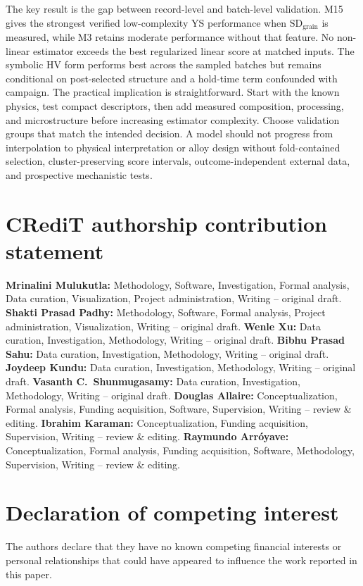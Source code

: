 \documentclass[5p,times,twocolumn]{elsarticle}
\begin{document}
The key result is the gap between record-level and batch-level validation. M15 gives the strongest verified low-complexity YS performance when $\mathrm{SD}_{\mathrm{grain}}$ is measured, while M3 retains moderate performance without that feature. No non-linear estimator exceeds the best regularized linear score at matched inputs. The symbolic HV form performs best across the sampled batches but remains conditional on post-selected structure and a hold-time term confounded with campaign. The practical implication is straightforward. Start with the known physics, test compact descriptors, then add measured composition, processing, and microstructure before increasing estimator complexity. Choose validation groups that match the intended decision. A model should not progress from interpolation to physical interpretation or alloy design without fold-contained selection, cluster-preserving score intervals, outcome-independent external data, and prospective mechanistic tests.

\section*{CRediT authorship contribution statement}
\textbf{Mrinalini Mulukutla:} Methodology, Software, Investigation, Formal analysis, Data curation, Visualization, Project administration, Writing -- original draft.
\textbf{Shakti Prasad Padhy:} Methodology, Software, Formal analysis, Project administration, Visualization, Writing -- original draft.
\textbf{Wenle Xu:} Data curation, Investigation, Methodology, Writing -- original draft.
\textbf{Bibhu Prasad Sahu:} Data curation, Investigation, Methodology, Writing -- original draft.
\textbf{Joydeep Kundu:} Data curation, Investigation, Methodology, Writing -- original draft.
\textbf{Vasanth C.\ Shunmugasamy:} Data curation, Investigation, Methodology, Writing -- original draft.
\textbf{Douglas Allaire:} Conceptualization, Formal analysis, Funding acquisition, Software, Supervision, Writing -- review \& editing.
\textbf{Ibrahim Karaman:} Conceptualization, Funding acquisition, Supervision, Writing -- review \& editing.
\textbf{Raymundo Arr\'{o}yave:} Conceptualization, Formal analysis, Funding acquisition, Software, Methodology, Supervision, Writing -- review \& editing.

\section*{Declaration of competing interest}
The authors declare that they have no known competing financial interests or personal relationships that could have appeared to influence the work reported in this paper.
\end{document}
